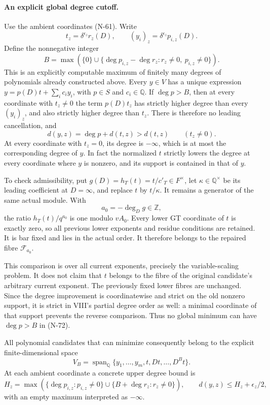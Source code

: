 \paragraph{An explicit global degree cutoff.}
Use the ambient coordinates (N-61).  Write
\[
 t_z=\delta^{\epsilon_z}r_z(D),\qquad
 (y_i)_z=\delta^{\epsilon_z}p_{i,z}(D).
\]
Define the nonnegative integer
\[
 B=\max\left(\{0\}\cup
       \{\deg p_{i,z}-\deg r_z:
                   r_z\ne0,\ p_{i,z}\ne0\}\right).
 \tag{N-73}
\]
This is an explicitly computable maximum of finitely many
degrees of polynomials already constructed above.  Every
$y\in V$ has a unique expression
$y=p(D)t+\sum_i c_i y_i$, with $p\in S$ and $c_i\in\mathbb Q$.
If $\deg p>B$, then at every coordinate with $t_z\ne0$
the term $p(D)t_z$ has strictly higher degree than every
$(y_i)_z$, and also strictly higher degree than $t_z$.
There is therefore no leading cancellation, and
\[
             d(y,z)=\deg p+d(t,z)>d(t,z)
                       \qquad(t_z\ne0).
\]
At every coordinate with $t_z=0$, its degree is $-\infty$,
which is at most the corresponding degree of $y$.
In fact the normalized $t$ strictly lowers the degree at
every coordinate where $y$ is nonzero, and its support is
contained in that of $y$.

To check admissibility, put $g(D)=h_T(t)=t/c'_T\in F^\times$,
let $\kappa\in\mathbb Q^\times$ be its leading coefficient
at $D=\infty$, and replace $t$ by $t/\kappa$.
It remains a generator of the same actual module.
With
\[
                     a_0=-\deg_D g\in\mathbb Z,
\]
the ratio $h_T(t)/q^{a_0}$ is one modulo $vA_0$.
Every lower GT coordinate of $t$ is exactly zero, so all
previous lower exponents and residue conditions are retained.
It is bar fixed and lies in the actual order.  It therefore
belongs to the repaired fibre $\mathcal F_{a_0}$.

This comparison is over all current exponents, precisely
the variable-scaling problem.  It does not claim that $t$
belongs to the fibre of the original candidate's arbitrary
current exponent.  The previously fixed lower fibres are
unchanged.  Since the degree improvement is coordinatewise
and strict on the old nonzero support, it is strict in
VIII's partial degree order as well: a minimal coordinate
of that support prevents the reverse comparison.
Thus no global minimum can have $\deg p>B$ in (N-72).

All polynomial candidates that can minimize consequently
belong to the explicit finite-dimensional space
\[
 V_B=\operatorname{span}_{\mathbb Q}
       \{y_1,\ldots,y_m,t,Dt,\ldots,D^B t\}.
 \tag{N-74}
\]
At each ambient coordinate a concrete upper degree bound is
\[
 H_z=\max\left(\{\deg p_{i,z}:p_{i,z}\ne0\}
           \cup\{B+\deg r_z:r_z\ne0\}\right),
 \qquad
 d(y,z)\le H_z+\epsilon_z/2,
 \tag{N-75}
\]
with an empty maximum interpreted as $-\infty$.

